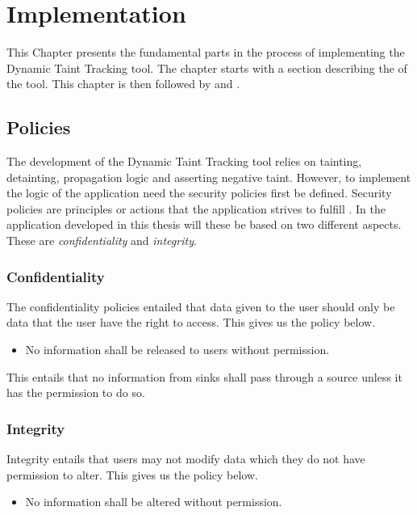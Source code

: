\chapter{Implementation}
This Chapter presents the fundamental parts in the process of implementing the Dynamic Taint Tracking tool. The chapter starts with a section describing the \textit{} of the tool. This chapter is then followed by \textit{} and \textit{}.



\section{Policies}
\label{Policies}
The development of the Dynamic Taint Tracking tool relies on tainting, detainting, propagation logic and asserting negative taint. However, to implement the logic of the application need the security policies first be defined. Security policies are principles or actions that the application strives to fulfill \parencite{BayukJenniferL2012Cspg}. In the application developed in this thesis will these be based on two different aspects. These are \textit{confidentiality} and \textit{integrity}.



\subsection{Confidentiality}
The confidentiality policies entailed that data given to the user should only be data that the user have the right to access. This gives us the policy below.

\hfill
\begin{itemize}
    \item No information shall be released to users without permission.
\end{itemize}
\hfill

This entails that no information from sinks shall pass through a source unless it has the permission to do so.



\subsection{Integrity}
Integrity entails that users may not modify data which they do not have permission to alter. This gives us the policy below.

\hfill
\begin{itemize}
    \item No information shall be altered without permission.
\end{itemize}
\hfill

